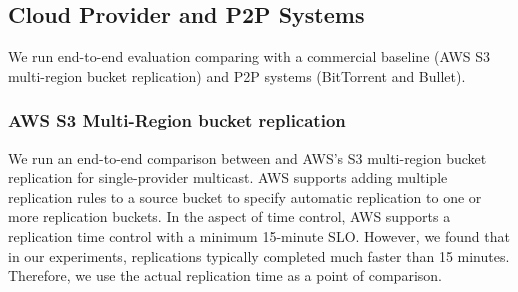 % 








\subsection{Cloud Provider and P2P Systems}
\label{sec:sys_eval}
We run end-to-end evaluation comparing \sys{} with a commercial baseline (AWS S3 multi-region bucket replication) and P2P systems (BitTorrent and Bullet). 

\subsubsection{AWS S3 Multi-Region bucket replication}
We run an end-to-end comparison between \sys{} and AWS's S3 multi-region bucket replication\cite{aws-replication} for single-provider multicast.
AWS supports adding multiple replication rules to a source bucket to specify automatic replication to one or more replication buckets. 
In the aspect of time control, AWS supports a replication time control with a minimum 15-minute SLO. However, we found that in our experiments, replications typically completed much faster than 15 minutes. Therefore, we use the actual replication time as a point of comparison. 


